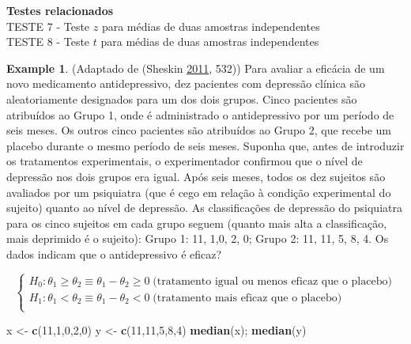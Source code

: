 \documentclass[
]{book}
\newenvironment{Shaded}{\begin{snugshade}}{\end{snugshade}}
\newcommand{\DecValTok}[1]{\textcolor[rgb]{0.00,0.00,0.81}{#1}}
\newcommand{\KeywordTok}[1]{\textcolor[rgb]{0.13,0.29,0.53}{\textbf{#1}}}
\newcommand{\NormalTok}[1]{#1}
\newcommand{\StringTok}[1]{\textcolor[rgb]{0.31,0.60,0.02}{#1}}
\theoremstyle{definition}
\theoremstyle{definition}
\newtheorem{example}{Example}[chapter]
\theoremstyle{definition}
\theoremstyle{remark}
\begin{document}
\textbf{Testes relacionados}\\
TESTE 7 - Teste \(z\) para médias de duas amostras independentes\\
TESTE 8 - Teste \(t\) para médias de duas amostras independentes

\begin{example}
\protect\hypertarget{exm:mw1}{}{\label{exm:mw1} }(Adaptado de (Sheskin \protect\hyperlink{ref-sheskin2011handbook}{2011}, 532)) Para avaliar a eficácia de um novo medicamento antidepressivo, dez pacientes com depressão clínica são aleatoriamente designados para um dos dois grupos. Cinco pacientes são atribuídos ao Grupo 1, onde é administrado o antidepressivo por um período de seis meses. Os outros cinco pacientes são atribuídos ao Grupo 2, que recebe um placebo durante o mesmo período de seis meses. Suponha que, antes de introduzir os tratamentos experimentais, o experimentador confirmou que o nível de depressão nos dois grupos era igual. Após seis meses, todos os dez sujeitos são avaliados por um psiquiatra (que é cego em relação à condição experimental do sujeito) quanto ao nível de depressão. As classificações de depressão do psiquiatra para os cinco sujeitos em cada grupo seguem (quanto mais alta a classificação, mais deprimido é o sujeito): Grupo 1: 11, 1,0, 2, 0; Grupo 2: 11, 11, 5, 8, 4. Os dados indicam que o antidepressivo é eficaz?

\[\left\{ 
    \begin{array}{l}
      H_0: \theta_1 \ge \theta_2 \equiv \theta_1 - \theta_2 \ge 0 \; \text{(tratamento igual ou menos eficaz que o placebo)} \\
      H_1: \theta_1 < \theta_2 \equiv \theta_1 - \theta_2 < 0 \; \text{(tratamento mais eficaz que o placebo)} \\ \end{array} \right. \]
\end{example}

\begin{Shaded}
\begin{Highlighting}[]
\NormalTok{x \textless{}{-}}\StringTok{ }\KeywordTok{c}\NormalTok{(}\DecValTok{11}\NormalTok{,}\DecValTok{1}\NormalTok{,}\DecValTok{0}\NormalTok{,}\DecValTok{2}\NormalTok{,}\DecValTok{0}\NormalTok{)}
\NormalTok{y \textless{}{-}}\StringTok{ }\KeywordTok{c}\NormalTok{(}\DecValTok{11}\NormalTok{,}\DecValTok{11}\NormalTok{,}\DecValTok{5}\NormalTok{,}\DecValTok{8}\NormalTok{,}\DecValTok{4}\NormalTok{)}
\KeywordTok{median}\NormalTok{(x); }\KeywordTok{median}\NormalTok{(y)}
\end{Highlighting}
\end{Shaded}
\end{document}
